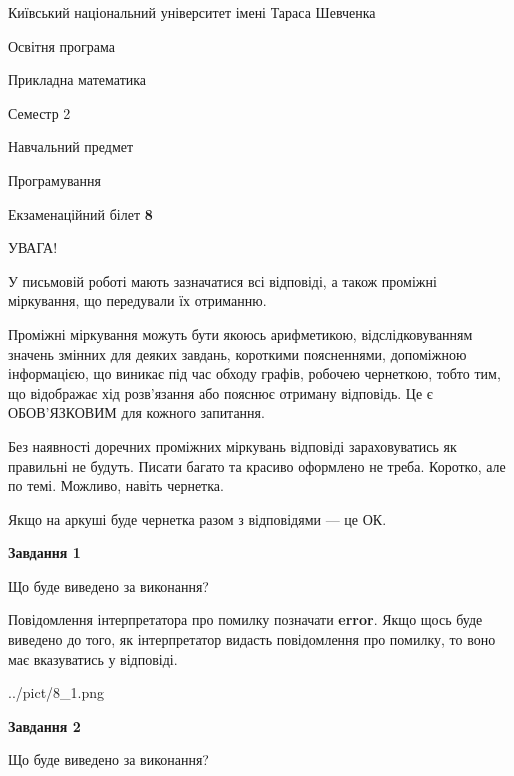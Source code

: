 \documentclass[12pt, ukrainian]{article}
\begin{document}
{{\begin {small}\par
{ \center  Київський національний університет імені Тараса Шевченка \par}
{\parbox {5 cm}{Освітня програма \hfill}{\parbox {7 cm}{Прикладна математика \hfill}}\parbox {6 cm}{\hfill Семестр 2}}\par
{\parbox {5 cm} {Навчальний предмет \hfill}\parbox {7 cm}{Програмування \hfill}\parbox {6cm}{\hfill}\par}\vspace{-7pt} \end{small}}{\center Екзаменаційний білет \No \textbf
{ 8 }\par}}
{
\begin {large}
УВАГА!

У письмовій роботі мають зазначатися всі відповіді, а також проміжні міркування, що передували їх отриманню.

Проміжні міркування можуть бути якоюсь арифметикою, відслідковуванням зна\-чень змінних для деяких завдань,
короткими поясненнями, допоміжною інформацією, що виникає під час обходу графів, робочею чернеткою,
тобто тим, що відображає хід розв’язання або пояснює отриману відповідь.
Це є ОБОВ’ЯЗКОВИМ для кожного запитання.

Без наявності доречних проміжних міркувань відповіді зараховуватись як правиль\-ні не будуть.
Писати багато та красиво оформлено не треба. Коротко, але по темі. Можли\-во, навіть чернетка.

Якщо на аркуші буде чернетка разом з відповідями --- це ОК.

\newpage

{\begin {center}\textbf{Завдання 1}\end {center}}\par
Що буде виведено за виконання?

Повідомлення інтерпретатора про помилку позначати \textbf{error}.
Якщо щось буде виведено до того, як інтерпретатор видасть повідомлення про помилку, 
то воно має вказуватись у відповіді. \par


\begin{center}
	{../pict/8_1.png}
\end{center}
\newpage

{\begin {center}\textbf{Завдання 2}\end {center}}\par
Що буде виведено за виконання?


\end{large}}
\end{document}

